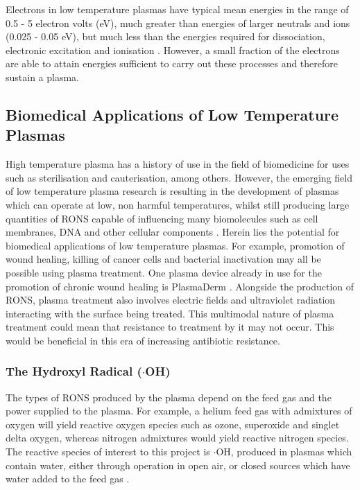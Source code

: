 \documentclass[11pt, oneside]{article}   	%
\begin{document}
Electrons in low temperature plasmas have typical mean energies in the range of 0.5 - 5 electron volts (eV), much greater than energies of larger neutrals and ions (0.025 - 0.05 eV), but much less than the energies required for dissociation, electronic excitation and ionisation \cite{Christophorou2012}.
However, a small fraction of the electrons are able to attain energies sufficient to carry out these processes and therefore sustain a plasma.

\subsection{Biomedical Applications of Low Temperature Plasmas}

High temperature plasma has a history of use in the field of biomedicine for uses such as sterilisation and cauterisation, among others.
However, the emerging field of low temperature plasma research is resulting in the development of plasmas which can operate at low, non harmful temperatures, whilst still producing large quantities of RONS capable of influencing many biomolecules such as cell membranes, DNA and other cellular components \cite{Graves2012}.
Herein lies the potential for biomedical applications of low temperature plasmas.
For example, promotion of wound healing, killing of cancer cells and bacterial inactivation may all be possible using plasma treatment.
One plasma device already in use for the promotion of chronic wound healing is PlasmaDerm \cite{BrehmerHD2015}.
Alongside the production of RONS, plasma treatment also involves electric fields and ultraviolet radiation interacting with the surface being treated.
This multimodal nature of plasma treatment could mean that resistance to treatment by it may not occur. 
This would be beneficial in this era of increasing antibiotic resistance.



\subsubsection{The Hydroxyl Radical ($\cdot$OH)} \label{sec:HydroxylRadical}

The types of RONS produced by the plasma depend on the feed gas and the power supplied to the plasma.
For example, a helium feed gas with admixtures of oxygen will yield reactive oxygen species such as ozone, superoxide and singlet delta oxygen, whereas nitrogen admixtures would yield reactive nitrogen species. 
The reactive species of interest to this project is $\cdot$OH, produced in plasmas which contain water, either through operation in open air, or closed sources which have water added to the feed gas \cite{Schroter2015}.
\end{document}
